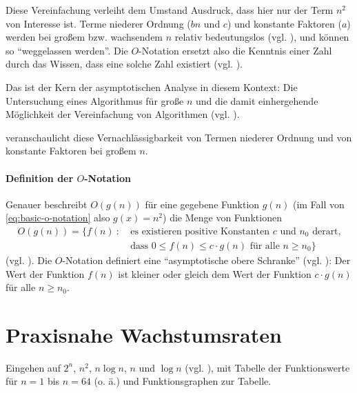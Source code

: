 Diese Vereinfachung verleiht dem Umstand Ausdruck, dass hier nur der Term $n^2$ von Interesse ist. Terme niederer Ordnung ($bn$ und $c$) und konstante Faktoren ($a$) werden bei großem bzw. wachsendem $n$ relativ bedeutungslos (vgl. \cite[28]{clrs2001}), und können so \enquote{weggelassen werden}. Die $O$-Notation ersetzt also die Kenntnis einer Zahl durch das Wissen, dass eine solche Zahl existiert (vgl. \cite[3]{bru1958}).

Das ist der Kern der asymptotischen Analyse in diesem Kontext: Die Untersuchung eines Algorithmus für große $n$ und die damit einhergehende Möglichkeit der Vereinfachung von Algorithmen (vgl. \cite[63]{sha2011}).



 veranschaulicht diese Vernachlässigbarkeit von Termen niederer Ordnung und von konstante Faktoren bei großem $n$.

\paragraph{Definition der $O$-Notation}

Genauer beschreibt $O(g(n))$ für eine gegebene Funktion $g(n)$ (im Fall von \eqref{eq:basic-o-notation} also $g(x) = n^2$) die Menge von Funktionen
\begin{equation*}
\begin{split}
    O(g(n))=\{f(n)\ :\ &\text{es existieren positive Konstanten $c$ und $n_0$ derart,}\\
         &\text{dass $0 \leq f(n) \leq c \cdot g(n)$ für alle $n \geq n_0$}\}
\end{split}
\end{equation*}
(vgl. \cite[37]{meh1984}). Die $O$-Notation definiert eine \enquote{asymptotische obere Schranke} (vgl. \cite[64]{sha2011}): Der Wert der Funktion $f(n)$ ist kleiner oder gleich dem Wert der Funktion $c \cdot g(n)$ für alle $n \geq n_0$.

\section{Praxisnahe Wachstumsraten}


Eingehen auf $2^n$, $n^2$, $n \log n$, $n$ und $\log n$ (vgl. \cite[38f]{hsr1997}), mit Tabelle der Funktionswerte für $n = 1$ bis $n = 64$ (o. ä.) und Funktionsgraphen zur Tabelle.

